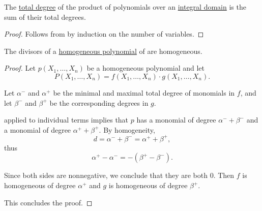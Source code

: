 \begin{proposition}\label{thm:degree_of_multivariate_polynomial_product}
  The \hyperref[def:polynomial_degree]{total degree} of the product of polynomials over an \hyperref[def:integral_domain]{integral domain} is the sum of their total degrees.
\end{proposition}
\begin{proof}
  Follows from  by induction on the number of variables.
\end{proof}

\begin{proposition}\label{thm:divisors_of_homogeneous_polynomial}
  The divisors of a \hyperref[def:homogeneous_polynomial]{homogeneous polynomial} of are homogeneous.
\end{proposition}
\begin{proof}
  Let \( p(X_1, \ldots, X_n) \) be a homogeneous polynomial and let
  \begin{equation*}
    P(X_1, \ldots, X_n) = f(X_1, \ldots, X_n) \cdot g(X_1, \ldots, X_n).
  \end{equation*}

  Let \( \alpha^- \) and \( \alpha^+ \) be the minimal and maximal total degree of monomials in \( f \), and let \( \beta^- \) and \( \beta^+ \) be the corresponding degrees in \( g \).

   applied to individual terms implies that \( p \) has a monomial of degree \( \alpha^- + \beta^- \) and a monomial of degree \( \alpha^+ + \beta^+ \). By homogeneity,
  \begin{equation*}
    d = \alpha^- + \beta^- = \alpha^+ + \beta^+,
  \end{equation*}
  thus
  \begin{equation*}
    \alpha^+ - \alpha^- = - (\beta^+ - \beta^-).
  \end{equation*}

  Since both sides are nonnegative, we conclude that they are both \( 0 \). Then \( f \) is homogeneous of degree \( \alpha^+ \) and \( g \) is homogeneous of degree \( \beta^+ \).

  This concludes the proof.
\end{proof}

